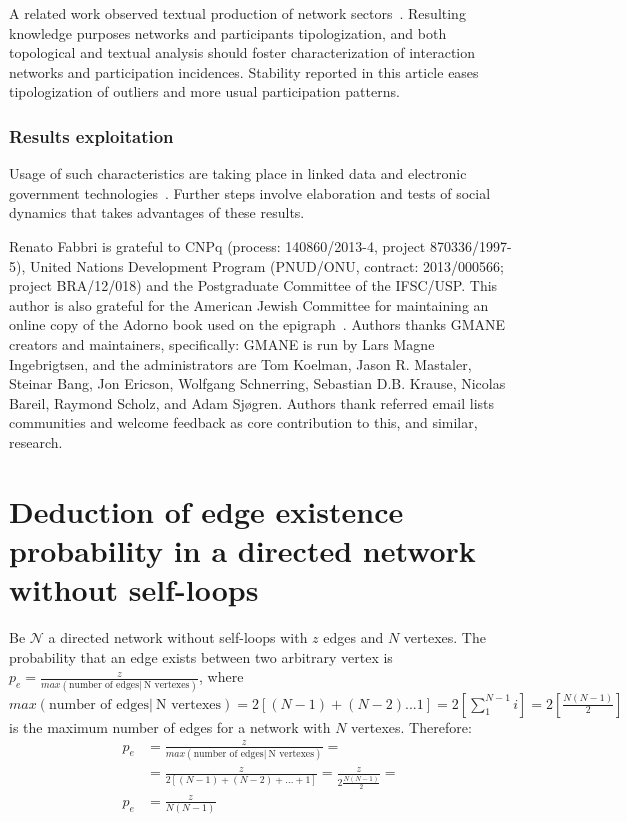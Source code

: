 \documentclass[%
 aip,
 jmp,%
 amsmath,amssymb,
 reprint,%
]{revtex4-1}
\begin{document}
A related work observed textual production of network sectors~\cite{rcText}. Resulting knowledge purposes networks and participants tipologization, and both topological and textual analysis should foster characterization of interaction networks and participation incidences.
Stability reported in this article eases tipologization of outliers and more usual participation patterns.

        \subsubsection{Results exploitation}
Usage of such characteristics are taking place in linked data and electronic government technologies~\cite{ops,opa,ensaio}. Further steps involve elaboration and tests of social dynamics that takes advantages of these results.

\begin{acknowledgments}
Renato Fabbri is grateful to CNPq (process: 140860/2013-4,
project 870336/1997-5), United Nations Development Program (PNUD/ONU, contract: 2013/000566; project BRA/12/018)  and 
the Postgraduate Committee of the IFSC/USP. This author is also grateful for
the American Jewish Committee for maintaining an online copy of the Adorno book
used on the epigraph~\cite{adorno}. Authors thanks GMANE creators and maintainers, specifically: GMANE is run by Lars Magne Ingebrigtsen, and the administrators are Tom Koelman, Jason R. Mastaler, Steinar Bang, Jon Ericson, Wolfgang Schnerring, Sebastian D.B. Krause, Nicolas Bareil, Raymond Scholz, and Adam Sjøgren. Authors thank referred email lists communities and welcome feedback as core contribution to this, and similar, research.
\end{acknowledgments}


\appendix
\section{Deduction of edge existence probability in a directed network without self-loops}\label{ap:ded}
Be $\mathcal{N}$ a directed network without self-loops with $z$ edges and $N$ vertexes. The probability that an edge exists between two arbitrary vertex is $p_e=\frac{z}{max( \text{number of edges} |\ \text{N vertexes})}$, where $max( \text{number of edges} |\ \text{N vertexes})=2[(N-1)+(N-2)...1]=2[\sum_1^{N-1}i]=2[\frac{N(N-1)}{2}]$ is the maximum number of edges for a network with $N$ vertexes. Therefore:
\begin{align}
    p_e&=\frac{z}{max( \text{number of edges} |\ \text{N vertexes})}=\nonumber\\
       &=\frac{z}{2[(N-1)+(N-2)+...+1]}=\frac{z}{2\frac{N(N-1)}{2}}=\nonumber\\
   p_e &=\frac{z}{N(N-1)}
\end{align}
\end{document}
